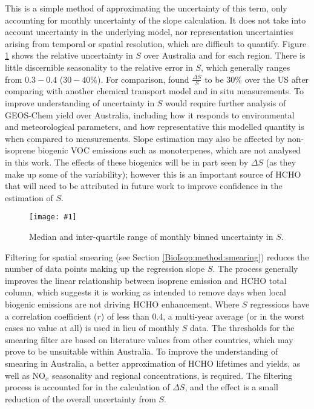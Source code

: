 \documentclass[acp, manuscript]{copernicus}
\newcommand{\textcite}{\citet}
\newcommand{\mypic}[3]{%
  \begin{figure}
    \texttt{[image: \#1]}
    \caption{#2}
    #3
  \end{figure}
}
\begin{document}
    
    This is a simple method of approximating the uncertainty of this term, only accounting for monthly uncertainty of the slope calculation.
    It does not take into account uncertainty in the underlying model, nor representation uncertainties arising from temporal or spatial resolution, which are difficult to quantify.
    Figure \ref{BioIsop:uncertainty:Model:fig_Srerrsummary} shows the relative uncertainty in $S$ over Australia and for each region.
    There is little discernible seasonality to the relative error in $S$, which generally ranges from $0.3-0.4$ ($30-40\%$).
    For comparison, \textcite{Palmer2006} found $\frac{\Delta S}{S}$ to be 30\% over the US after comparing with another chemical transport model and in situ measurements.
    To improve understanding of uncertainty in $S$ would require further analysis of GEOS-Chem yield over Australia, including how it responds to environmental and meteorological parameters, and how representative this modelled quantity is when compared to measurements.
    Slope estimation may also be affected by non-isoprene biogenic VOC emissions such as monoterpenes, which are not analysed in this work. 
    The effects of these biogenics will be in part seen by $\Delta S$ (as they make up some of the variability); however this is an important source of HCHO that will need to be attributed in future work to improve confidence in the estimation of $S$. 
    
    \mypic{Figures/mya_Srerr.png}{%
      Median and inter-quartile range of monthly binned uncertainty in $S$.
    }{\label{BioIsop:uncertainty:Model:fig_Srerrsummary}}
    
    Filtering for spatial smearing (see Section \ref{BioIsop:method:smearing}) reduces the number of data points making up the regression slope $S$. 
    The process generally improves the linear relationship between isoprene emission and HCHO total column, which suggests it is working as intended to remove days when local biogenic emissions are not driving HCHO enhancement.
    Where $S$ regressions have a correlation coefficient ($r$) of less than 0.4, a multi-year average (or in the worst cases no value at all) is used in lieu of monthly $S$ data.
    The thresholds for the smearing filter are based on literature values from other countries, which may prove to be unsuitable within Australia.
    To improve the understanding of smearing in Australia, a better approximation of HCHO lifetimes and yields, as well as NO$_x$ seasonality and regional concentrations, is required.
    The filtering process is accounted for in the calculation of $\Delta S$, and the effect is a small reduction of the overall uncertainty from $S$.
    
\end{document}
